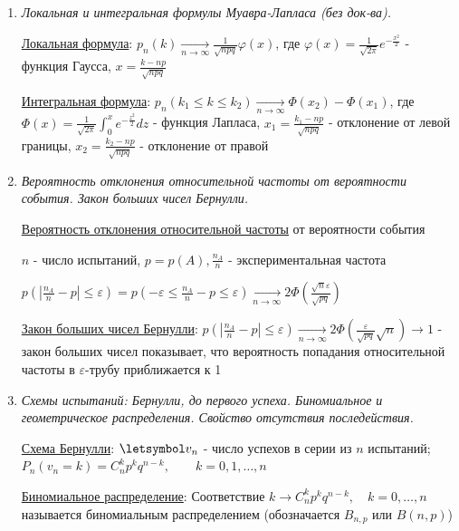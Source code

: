 \documentclass[12pt]{article}
\begin{document}
\begin{enumerate}
    \item \textit{Локальная и интегральная формулы Муавра-Лапласа (без док-ва).}

    \hyperlink{localformulademoivrelaplace}{Локальная формула}: $p_n(k) \underset{n \to \infty}{\longrightarrow} \frac{1}{\sqrt{npq}} \varphi(x)$, где $\varphi(x) = \frac{1}{\sqrt{2\pi}} e^{-\frac{x^2}{2}}$ - функция Гаусса, 
    $x = \frac{k - np}{\sqrt{npq}}$

    \hyperlink{integralformulademoivrelaplace}{Интегральная формула}: $p_n(k_1 \leq k \leq k_2) \underset{n \to \infty}{\longrightarrow} \Phi(x_2) - \Phi(x_1)$, где $\Phi(x) = \frac{1}{\sqrt{2\pi}} \int_0^x e^{-\frac{z^2}{2}} dz$ - функция Лапласа,
    $x_1 = \frac{k_1 - np}{\sqrt{npq}}$ - отклонение от левой границы, $x_2 = \frac{k_2 - np}{\sqrt{npq}}$ - отклонение от правой

    \item \textit{Вероятность отклонения относительной частоты от вероятности события. Закон больших чисел Бернулли.}

    \hyperlink{probabilityofdeviation}{Вероятность отклонения относительной частоты} от вероятности события

    $n$ - число испытаний, $p = p(A), \frac{n_A}{n}$ - экспериментальная частота

    $p\left(|\frac{n_A}{n} - p| \leq \varepsilon\right) = p\left(-\varepsilon \leq \frac{n_A}{n} - p \leq \varepsilon\right) \underset{n \to \infty}{\longrightarrow} 2\Phi\left(\frac{\sqrt{n}\varepsilon}{\sqrt{pq}}\right)$

    \hyperlink{lawofbignumbersbernoulli}{Закон больших чисел Бернулли}: $p\left(|\frac{n_A}{n} - p| \leq \varepsilon\right) \underset{n \to \infty}{\longrightarrow} 2 \Phi\left(\frac{\varepsilon}{\sqrt{pq}}\sqrt{n}\right) \to 1$ - 
    закон больших чисел показывает, что вероятность попадания относительной частоты в $\varepsilon$-трубу приближается к 1

    \item \textit{Схемы испытаний: Бернулли, до первого успеха. Биномиальное и геометрическое распределения. Свойство отсутствия последействия.}

    \hyperlink{bernoullischema2}{Схема Бернулли}: $\letsymbol v_n$ - число успехов в серии из $n$ испытаний; 
    $P_n(v_n = k) = C^k_n p^k q^{n - k}, \quad\quad k = 0, 1, \dots, n$

    \hyperlink{binomialdistribution}{Биномиальное распределение}: Соответствие $k \rightarrow C^k_n p^k q^{n - k}, \quad k = 0, \dots, n$ называется биномиальным распределением
    (обозначается $B_{n,p}$ или $B(n, p)$)


\end{enumerate}
\end{document}
